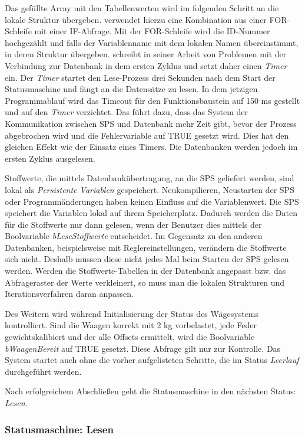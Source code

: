 Das gefüllte Array mit den Tabellenwerten wird im folgenden Schritt an die lokale Struktur übergeben. \textsc{\citeauthor{Nuerenberg2015}} verwendet hierzu eine Kombination aus einer FOR-Schleife mit einer IF-Abfrage. Mit der FOR-Schleife wird die ID-Nummer hochgezählt und falls der Variablenname mit dem lokalen Namen übereinstimmt, in deren Struktur übergeben.  
\textsc{\citeauthor{Nuerenberg2015}} schreibt in seiner Arbeit von Problemen mit der Verbindung zur Datenbank in dem ersten Zyklus und setzt daher einen \textit{Timer} ein. Der \textit{Timer} startet den Lese-Prozess drei Sekunden nach dem Start der Statusmaschine und fängt an die Datensätze zu lesen. In dem jetzigen Programmablauf wird das Timeout für den Funktionsbaustein auf 150 ms gestellt und auf den \textit{Timer} verzichtet. Das führt dazu, dass das System der Kommunikation zwischen SPS und Datenbank mehr Zeit gibt, bevor der Prozess abgebrochen wird und die Fehlervariable auf TRUE gesetzt wird. Dies hat den gleichen Effekt wie der Einsatz eines Timers. Die Datenbanken werden jedoch im ersten Zyklus ausgelesen. 

Stoffwerte, die mittels Datenbankübertragung, an die SPS geliefert werden, sind lokal als \textit{Persistente Variablen} gespeichert. Neukompilieren, Neustarten der SPS oder Programmänderungen haben keinen Einfluss auf die Variablenwert. Die SPS speichert die Variablen lokal auf ihrem Speicherplatz. Dadurch werden die Daten für die Stoffwerte nur dann gelesen, wenn der Benutzer dies mittels der Boolvariable \textit{bLeseStoffwerte} entscheidet. Im Gegensatz zu den anderen Datenbanken, beispielsweise mit Reglereinstellungen, verändern die Stoffwerte sich nicht. Deshalb müssen diese nicht jedes Mal beim Starten der SPS gelesen werden. Werden die Stoffwerte-Tabellen in der Datenbank angepasst bzw. das Abfrageraster der Werte verkleinert, so muss man die lokalen Strukturen und Iterationsverfahren daran anpassen. 

Des Weitern wird während Initialisierung der Status des Wägesystems kontrolliert. Sind die Waagen korrekt mit 2 kg vorbelastet, jede Feder gewichtskalibiert und der alle Offsets ermittelt, wird die Boolvariable  \textit{bWaagenBereit} auf TRUE gesetzt. Diese Abfrage gilt nur zur Kontrolle. Das System startet auch ohne die vorher aufgelisteten Schritte, die im Status \textit{Leerlauf} durchgeführt werden. 


Nach erfolgreichem Abschließen geht die Statusmaschine in den nächsten Status: \textit{Lesen}.

\subsubsection*{Statusmaschine: Lesen}

